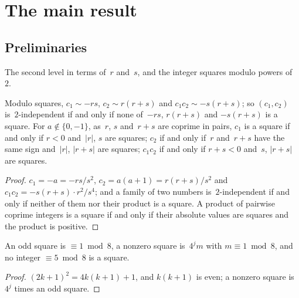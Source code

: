 \chapter{The main result}
\label{chap:main}

\section{Preliminaries}
\supporting

The second level in terms of~$r$ and~$s$, and the integer squares modulo powers of~$2$.

\begin{lemma}
  \label{lem:level2}
  \leanok
  Modulo squares, $c_1 \sim -rs$, $c_2 \sim r(r+s)$ and $c_1 c_2 \sim -s(r+s)$; so
  $(c_1, c_2)$ is~$2$-independent if and only if none of~$-rs$, $r(r+s)$ and $-s(r+s)$ is a
  square. For $a \notin \{0, -1\}$, as~$r$, $s$ and~$r + s$ are coprime in pairs, $c_1$ is a
  square if and only if $r < 0$ and~$|r|$, $s$ are squares; $c_2$ if and only if~$r$ and~$r + s$
  have the same sign and~$|r|$, $|r + s|$ are squares; $c_1 c_2$ if and only if $r + s < 0$
  and~$s$, $|r + s|$ are squares.
\end{lemma}
\begin{proof}
  \leanok
  $c_1 = -a = -rs/s^2$, $c_2 = a(a+1) = r(r+s)/s^2$ and $c_1 c_2 = -s(r+s) \cdot r^2/s^4$; and a
  family of two numbers is~$2$-independent if and only if neither of them nor their product is a
  square. A product of pairwise coprime integers is a square if and only if their absolute
  values are squares and the product is positive.
\end{proof}

\begin{lemma}
  \label{lem:squares2}
  \leanok
  An odd square is $\equiv 1 \bmod 8$, a nonzero square is~$4^j m$ with $m \equiv 1 \bmod 8$, and
  no integer $\equiv 5 \bmod 8$ is a square.
\end{lemma}
\begin{proof}
  \leanok
  $(2k + 1)^2 = 4k(k + 1) + 1$, and $k(k + 1)$ is even; a nonzero square is~$4^j$ times an odd
  square.
\end{proof}

